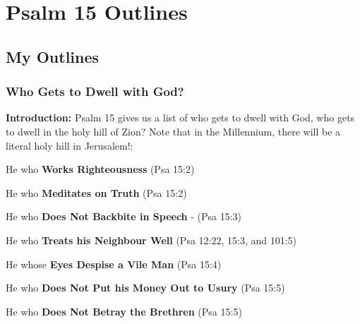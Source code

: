 \section{Psalm 15 Outlines}

\subsection{My Outlines}

\subsubsection{Who Gets to Dwell with God?}
\textbf{Introduction:} Psalm 15 gives us a list of who gets to dwell with God, who gets to dwell in the holy hill of Zion? Note that in the Millennium, there will be a literal holy hill in Jerusalem!:
\begin{compactenum}
    \item He who \textbf{Works Righteousness}  (Psa 15:2)
    \item He who \textbf{Meditates on Truth}  (Psa 15:2)
    \item He who \textbf{Does Not Backbite in Speech} -  (Psa 15:3)
    \item He who \textbf{Treats his Neighbour Well}    (Psa 12:22, 15:3, and 101:5)
    \item He whose \textbf{Eyes Despise a Vile Man}  (Psa 15:4)
    \item He who \textbf{Does Not Put his Money Out to Usury}  (Psa 15:5) 
    \item He who \textbf{Does Not Betray the Brethren}  (Psa 15:5) 
\end{compactenum}


